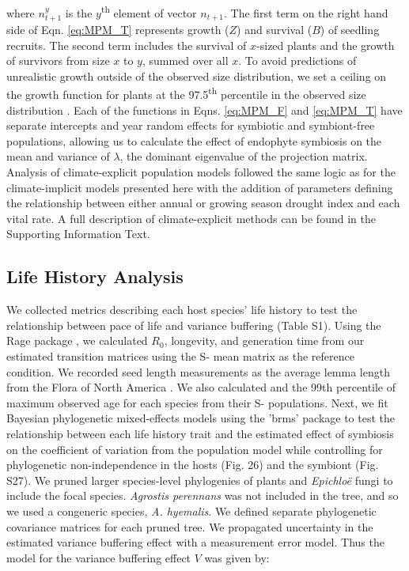 \documentclass[9pt,twocolumn,twoside]{pnas-new}
\begin{document}
{where $n^y_{t+1}$ is the $y$\textsuperscript{th} element of vector \textbf{$n_{t+1}$}.
The first term on the right hand side of Eqn. \ref{eq:MPM_T} represents growth ($Z$) and survival ($B$) of seedling recruits. 
The second term includes the survival of $x$-sized plants and the growth of survivors from size $x$ to $y$, summed over all $x$. 
To avoid predictions of unrealistic growth outside of the observed size distribution, we set a ceiling on the growth function for plants at the 97.5\textsuperscript{th} percentile in the observed size distribution \cite{williams2012avoiding}.
Each of the functions in Eqns. \ref{eq:MPM_F} and \ref{eq:MPM_T} have separate intercepts and year random effects for symbiotic and symbiont-free populations, allowing us to calculate the effect of endophyte symbiosis on the mean and variance of $\lambda$, the dominant eigenvalue of the projection matrix. 
Analysis of climate-explicit population models followed the same logic as for the climate-implicit models presented here with the addition of parameters defining the relationship between either annual or growing season drought index and each vital rate. A full description of climate-explicit methods can be found in the Supporting Information Text.

\subsection*{Life History Analysis}

We collected metrics describing each host species' life history to test the relationship between pace of life and variance buffering (Table S1). 
Using the Rage package \cite{jones2022rcompadre}, we calculated $R_0$, longevity, and generation time from our estimated transition matrices using the S- mean matrix as the reference condition.
We recorded seed length measurements as the average lemma length from the Flora of North America \cite{FloraNAonline}. 
We also calculated and the 99th percentile of maximum observed age for each species from their S- populations.
Next, we fit Bayesian phylogenetic mixed-effects models using the 'brms' package \cite{Burkner2017brms} to test the relationship between each life history trait and the estimated effect of symbiosis on the coefficient of variation from the population model while controlling for phylogenetic non-independence in the hosts (Fig. 26) and the symbiont (Fig. S27).
We pruned larger species-level phylogenies of plants\cite{zanne2014three} and \emph{Epichlo\"{e}} fungi \cite{leuchtmann2014nomenclatural} to include the focal species.
\emph{Agrostis perennans} was not included in the tree, and so we used a congeneric species, \emph{A. hyemalis}. 
We defined separate phylogenetic covariance matrices for each pruned tree.
We propagated uncertainty in the estimated variance buffering effect with a measurement error model.
Thus the model for the variance buffering effect $V$ was given by:

}
\end{document}

